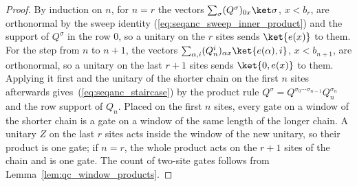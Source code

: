 \begin{proof}
    \leanok
    By induction on $n$, for $n=r$ the vectors $\sum_\sigma(Q^\sigma)_{0x}\ket\sigma$,
    $x<b_r$, are orthonormal by the sweep identity
    (\ref{eq:seqanc_sweep_inner_product}) and the support of $Q^\sigma$ in the
    row $0$, so a unitary on the $r$ sites sends $\ket{e(x)}$ to them. For
    the step from $n$ to $n+1$, the vectors
    $\sum_{\alpha,i}(Q_n^i)_{\alpha x}\ket{e(\alpha),i}$, $x<b_{n+1}$, are
    orthonormal, so a unitary on the last $r+1$ sites sends $\ket{0,e(x)}$ to
    them. Applying it first and the unitary of the shorter chain on the first
    $n$ sites afterwards gives~(\ref{eq:seqanc_staircase}) by the product rule
    $Q^\sigma=Q^{\sigma_0\cdots\sigma_{n-1}}Q_n^{\sigma_n}$ and the row support
    of $Q_n$. Placed on the first $n$ sites, every gate on a window of the
    shorter chain is a gate on a window of the same length of the longer
    chain. A unitary $Z$ on the last $r$ sites acts inside the window of
    the new unitary, so their product is one gate; if $n=r$, the whole
    product acts on the $r+1$ sites of the chain and is one gate. The count
    of two-site gates follows from Lemma~\ref{lem:qc_window_products}.
\end{proof}

